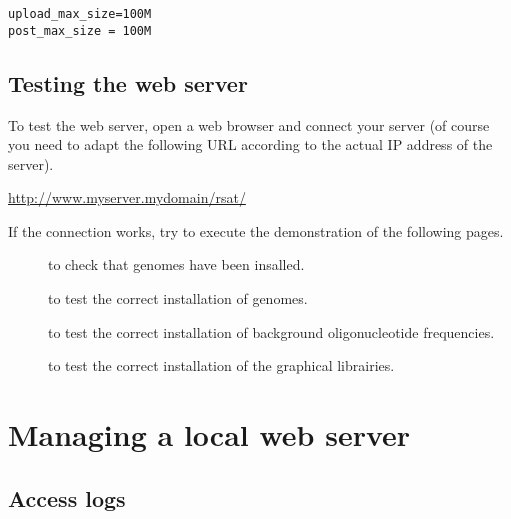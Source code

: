 \documentclass[12pt,a4paper, twoside]{scrreprt} %
\begin{document}
\begin{lstlisting}
upload_max_size=100M
post_max_size = 100M
\end{lstlisting}








\subsection{Testing the web server}

To test the web server, open a web browser and connect your \RSAT
server (of course you need to adapt the following URL according to the
actual IP address of the server).

\url{http://www.myserver.mydomain/rsat/} 

If the connection works, try to execute the demonstration of the
following pages.

\begin{description}
\item[] to check that genomes have
  been insalled.
  
\item[] to test the correct installation of
  genomes.

\item[] to test the correct installation of
  background oligonucleotide frequencies.

\item[] to test the correct installation of the
  graphical librairies.
\end{description}

\section{Managing a local web server}

\subsection{Access logs}
\end{document}
